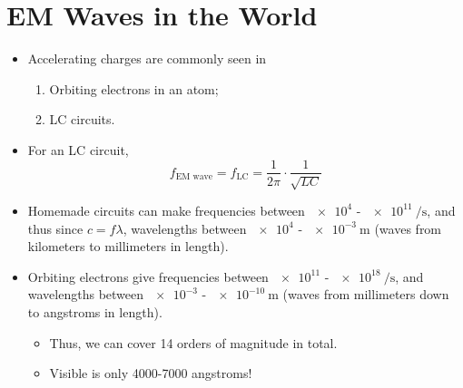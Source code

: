 \documentclass[../notes.tex]{subfiles}
\begin{document}
\section{EM Waves in the World}
\begin{itemize}
    \item Accelerating charges are commonly seen in
    \begin{enumerate}
        \item Orbiting electrons in an atom;
        \item LC circuits. 
    \end{enumerate}
    \item For an LC circuit,
    \begin{equation*}
        f_\text{EM wave} = f_\text{LC} = \frac{1}{2\pi}\cdot\frac{1}{\sqrt{LC}}
    \end{equation*}
    \item Homemade circuits can make frequencies between $\num{e4}$ - $\SI[per-mode=power]{e11}{\per\second}$, and thus since $c=f\lambda$, wavelengths between $\num{e4}$ - $\SI{e-3}{\meter}$ (waves from kilometers to millimeters in length).
    \item Orbiting electrons give frequencies between $\num{e11}$ - $\SI[per-mode=power]{e18}{\per\second}$, and wavelengths between $\num{e-3}$ - $\SI{e-10}{\meter}$ (waves from millimeters down to angstroms in length).
    \begin{itemize}
        \item Thus, we can cover 14 orders of magnitude in total.
        \item Visible is only 4000-7000 angstroms!
    \end{itemize}
\end{itemize}
\end{document}
